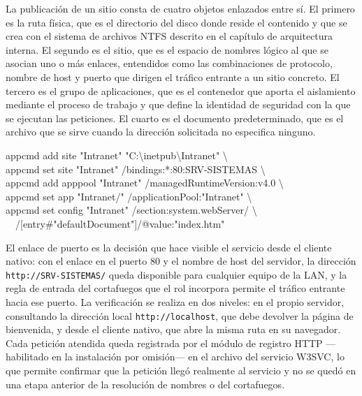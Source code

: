 \documentclass[12pt]{article}
\begin{document}
La publicación de un sitio consta de cuatro objetos enlazados entre sí. El primero es la ruta física, que es el directorio del disco donde reside el contenido y que se crea con el sistema de archivos NTFS descrito en el capítulo de arquitectura interna. El segundo es el sitio, que es el espacio de nombres lógico al que se asocian uno o más enlaces, entendidos como las combinaciones de protocolo, nombre de host y puerto que dirigen el tráfico entrante a un sitio concreto. El tercero es el grupo de aplicaciones, que es el contenedor que aporta el aislamiento mediante el proceso de trabajo y que define la identidad de seguridad con la que se ejecutan las peticiones. El cuarto es el documento predeterminado, que es el archivo que se sirve cuando la dirección solicitada no especifica ninguno.

\begin{mdframed}[style=terminal]
\ttfamily\upshape\color{bashLetterColor}\footnotesize
appcmd add site "Intranet" "C:\textbackslash inetpub\textbackslash Intranet" \textbackslash\\
appcmd set site "Intranet" /bindings:*:80:SRV-SISTEMAS \textbackslash\\
appcmd add apppool "Intranet" /managedRuntimeVersion:v4.0 \textbackslash\\
appcmd set app "Intranet/" /applicationPool:"Intranet" \textbackslash\\
appcmd set config "Intranet" /section:system.webServer/ \textbackslash\\
\ \ /[entry\#"defaultDocument"]/@value:"index.htm"
\end{mdframed}

El enlace de puerto es la decisión que hace visible el servicio desde el cliente nativo: con el enlace en el puerto 80 y el nombre de host del servidor, la dirección \texttt{http://SRV-SISTEMAS/} queda disponible para cualquier equipo de la LAN, y la regla de entrada del cortafuegos que el rol incorpora permite el tráfico entrante hacia ese puerto. La verificación se realiza en dos niveles: en el propio servidor, consultando la dirección local \texttt{http://localhost}, que debe devolver la página de bienvenida, y desde el cliente nativo, que abre la misma ruta en su navegador. Cada petición atendida queda registrada por el módulo de registro HTTP ---habilitado en la instalación por omisión--- en el archivo del servicio W3SVC, lo que permite confirmar que la petición llegó realmente al servicio y no se quedó en una etapa anterior de la resolución de nombres o del cortafuegos.
\end{document}
